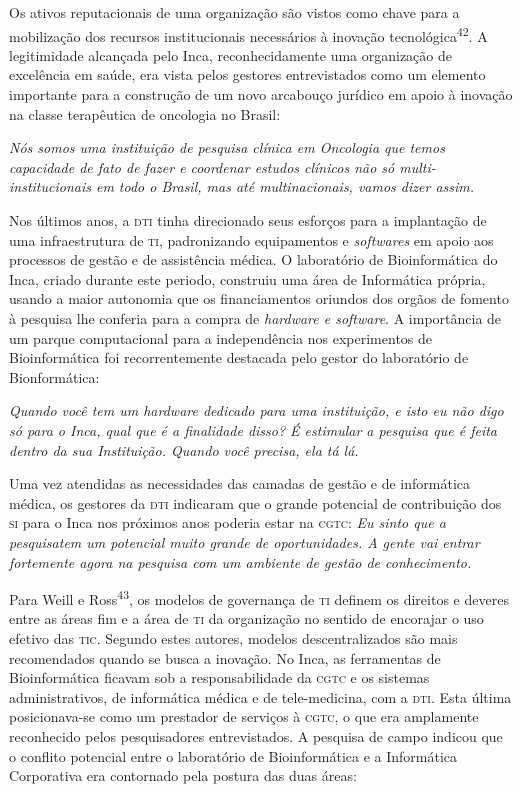 \documentclass{article}
\begin{document}
Os ativos reputacionais de uma organização são vistos como chave para a
mobilização dos recursos institucionais necessários à inovação
tecnológica\textsuperscript{42}. A legitimidade alcançada pelo Inca, reconhecidamente uma organização de
excelência em saúde, era vista pelos gestores entrevistados como um elemento
importante para a construção de um novo arcabouço jurídico em apoio à inovação
na classe terapêutica de oncologia no Brasil:

\textit{Nós somos uma instituição de pesquisa clínica em Oncologia que temos
capacidade de fato de fazer e coordenar estudos clínicos não só
multi-institucionais em todo o Brasil, mas até multinacionais, vamos dizer
assim.}

Nos últimos anos, a \textsc{dti} tinha direcionado seus esforços para a implantação de
uma infraestrutura de \textsc{ti}, padronizando equipamentos e \textit{softwares}
em apoio aos processos de gestão e de assistência médica. O laboratório de
Bioinformática do Inca, criado durante este periodo, construiu uma área de
Informática própria, usando a maior autonomia que os financiamentos oriundos dos
orgãos de fomento à pesquisa lhe conferia para a compra de \textit{hardware e
software}. A importância de um parque computacional para a independência nos experimentos
de Bioinformática foi recorrentemente destacada pelo gestor do laboratório de
Bionformática:

\textit{Quando você tem um hardware dedicado para uma instituição, e isto eu não
digo só para o Inca, qual que é a finalidade disso? É estimular a pesquisa que é
feita dentro da sua Instituição. Quando você precisa, ela tá lá.}

Uma vez atendidas as necessidades das camadas de gestão e de informática médica,
os gestores da \textsc{dti} indicaram que o grande potencial de contribuição dos \textsc{si} para
o Inca nos próximos anos poderia estar na \textsc{cgtc}: \textit{Eu sinto que a
pesquisatem um potencial muito grande de oportunidades. A gente vai entrar
fortemente agora na pesquisa com um ambiente de gestão de conhecimento.}

Para Weill e Ross\textsuperscript{43}, os modelos de governança de \textsc{ti} definem os direitos e deveres entre as áreas
fim e a área de \textsc{ti} da organização no sentido de encorajar o uso efetivo das \textsc{tic}.
Segundo estes autores, modelos descentralizados são mais recomendados quando se
busca a inovação. No Inca, as ferramentas de Bioinformática ficavam sob a
responsabilidade da \textsc{cgtc} e os sistemas administrativos, de informática médica e
de tele-medicina, com a \textsc{dti}. Esta última posicionava-se como um prestador de
serviços à \textsc{cgtc}, o que era amplamente reconhecido pelos pesquisadores
entrevistados. A pesquisa de campo indicou que o conflito potencial entre o
laboratório de Bioinformática e a Informática Corporativa era contornado pela
postura das duas áreas:
\end{document}
